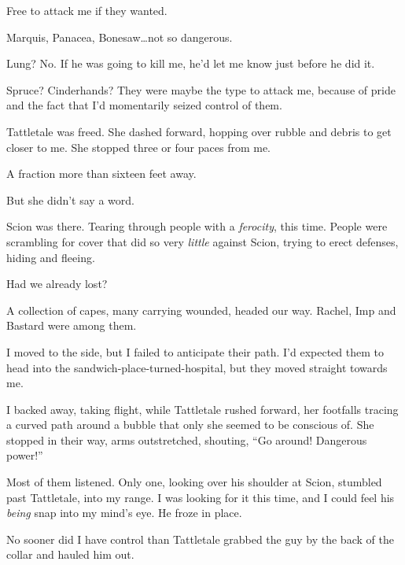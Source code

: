 Free to attack me if they wanted.



Marquis, Panacea, Bonesaw\ldots not so dangerous.



Lung?  No.  If he was going to kill me, he'd let me know just before he did it.



Spruce?  Cinderhands?  They were maybe the type to attack me, because of pride and the fact that I'd momentarily seized control of them.



Tattletale was freed.  She dashed forward, hopping over rubble and debris to get closer to me.  She stopped three or four paces from me.



A fraction more than sixteen feet away.



But she didn't say a word.



Scion was there.  Tearing through people with a \emph{ferocity}, this time.  People were scrambling for cover that did so very \emph{little} against Scion, trying to erect defenses, hiding and fleeing.



Had we already lost?



A collection of capes, many carrying wounded, headed our way.  Rachel, Imp and Bastard were among them.



I moved to the side, but I failed to anticipate their path.  I'd expected them to head into the sandwich-place-turned-hospital, but they moved straight towards me.



I backed away, taking flight, while Tattletale rushed forward, her footfalls tracing a curved path around a bubble that only she seemed to be conscious of.  She stopped in their way, arms outstretched, shouting, ``Go around!  Dangerous power!''



Most of them listened.  Only one, looking over his shoulder at Scion, stumbled past Tattletale, into my range.  I was looking for it this time, and I could feel his \emph{being} snap into my mind's eye.  He froze in place.



No sooner did I have control than Tattletale grabbed the guy by the back of the collar and hauled him out.



